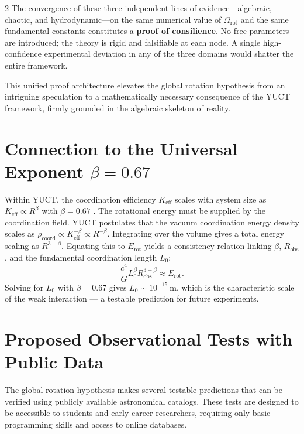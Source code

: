 \documentclass[12pt,a4paper]{article}
\newcommand{\Keff}{K_{\mathrm{eff}}}
\begin{document}
\begin{multicols}{2}
		The convergence of these three independent lines of evidence---algebraic, chaotic, and hydrodynamic---on the same numerical value of \(\Omega_{\mathrm{rot}}\) and the same fundamental constants constitutes a \textbf{proof of consilience}. No free parameters are introduced; the theory is rigid and falsifiable at each node. A single high-confidence experimental deviation in any of the three domains would shatter the entire framework.
		
		This unified proof architecture elevates the global rotation hypothesis from an intriguing speculation to a mathematically necessary consequence of the YUCT framework, firmly grounded in the algebraic skeleton of reality.
		
		\section{Connection to the Universal Exponent \(\beta = 0.67\)}
		
		Within YUCT, the coordination efficiency \(\Keff\) scales with system size as \(\Keff \propto R^{\beta}\) with \(\beta = 0.67\) \cite{AppendixL}. The rotational energy must be supplied by the coordination field. YUCT postulates that the vacuum coordination energy density scales as \(\rho_{\text{coord}} \propto \Keff^{-\beta} \propto R^{-\beta}\). Integrating over the volume gives a total energy scaling as \(R^{3-\beta}\). Equating this to \(E_{\text{rot}}\) yields a consistency relation linking \(\beta\), \(R_{\text{obs}}\), and the fundamental coordination length \(L_0\):
		\begin{equation}
			\frac{c^4}{G} L_0^{\beta} R_{\text{obs}}^{3-\beta} \approx E_{\text{rot}}.
		\end{equation}
		Solving for \(L_0\) with \(\beta = 0.67\) gives \(L_0 \sim 10^{-15}\ \text{m}\), which is the characteristic scale of the weak interaction — a testable prediction for future experiments.
		
		\section{Proposed Observational Tests with Public Data}
		
		The global rotation hypothesis makes several testable predictions that can be verified using publicly available astronomical catalogs. These tests are designed to be accessible to students and early-career researchers, requiring only basic programming skills and access to online databases.
		

\end{multicols}
\end{document}
